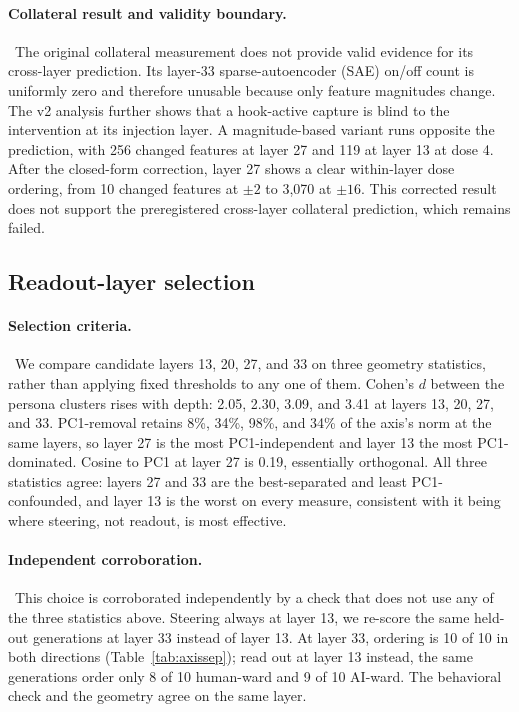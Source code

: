 \paragraph{Collateral result and validity boundary.}~The original collateral
measurement does not provide valid evidence for its
cross-layer prediction. Its layer-33 sparse-autoencoder (SAE) on/off count is
uniformly zero and therefore unusable because only feature magnitudes change.
The v2 analysis further shows that a hook-active capture is blind to the
intervention at its injection layer. A magnitude-based variant runs opposite
the prediction, with 256 changed features at layer 27 and 119 at layer 13 at
dose 4. After the closed-form correction, layer 27 shows a clear within-layer
dose ordering, from 10 changed features at $\pm2$ to 3{,}070 at $\pm16$. This
corrected result does not support the preregistered cross-layer collateral
prediction, which remains failed.

\subsection{Readout-layer selection}
\label{app:readoutlayer}

\paragraph{Selection criteria.}~We compare candidate layers 13, 20, 27, and 33 on three geometry statistics,
rather than applying fixed thresholds to any one of them. Cohen's $d$
between the persona clusters rises with depth: 2.05, 2.30, 3.09, and 3.41 at
layers 13, 20, 27, and 33. PC1-removal retains 8\%, 34\%, 98\%, and 34\% of
the axis's norm at the same layers, so layer 27 is the most PC1-independent
and layer 13 the most PC1-dominated. Cosine to PC1 at layer 27 is 0.19,
essentially orthogonal. All three statistics agree: layers 27 and 33 are
the best-separated and least PC1-confounded, and layer 13 is the worst on
every measure, consistent with it being where steering, not readout, is
most effective.

\paragraph{Independent corroboration.}~This choice is corroborated independently by a check that does not use any
of the three statistics above. Steering always at layer 13, we re-score the
same held-out generations at layer 33 instead of layer 13. At layer 33,
ordering is 10 of 10 in both directions (Table~\ref{tab:axissep}); read out
at layer 13 instead, the same generations order only 8 of 10 human-ward and
9 of 10 AI-ward. The behavioral check and the geometry agree on the same
layer.

